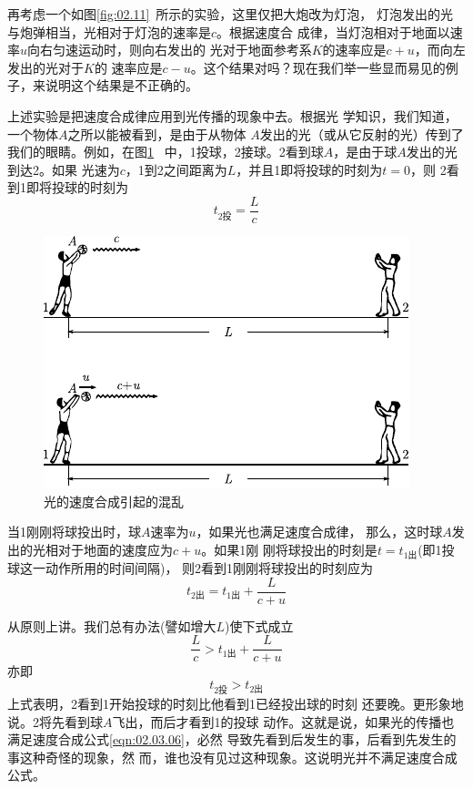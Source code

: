 再考虑一个如图\ref{fig:02.11}~所示的实验，这里仅把大炮改为灯泡，
灯泡发出的光与炮弹相当，光相对于灯泡的速率是$c$。根据速度合
成律，当灯泡相对于地面以速率$u$向右匀速运动时，则向右发出的
光对于地面参考系$K$的速率应是$c+u$，而向左发出的光对于$K$的
速率应是$c-u$。这个结果对吗？现在我们举一些显而易见的例
子，来说明这个结果是不正确的。

上述实验是把速度合成律应用到光传播的现象中去。根据光
学知识，我们知道，一个物体$A$之所以能被看到，是由于从物体
$A$发出的光（或从它反射的光）传到了我们的眼睛。例如，在图\ref{fig:02.12}~
中，1投球，2接球。2看到球$A$，是由于球$A$发出的光到达2。如果
光速为$c$，1到2之间距离为$L$，并且1即将投球的时刻为$t=0$，则
2看到1即将投球的时刻为
\begin{equation*}
    t_{2\text{投}}=\frac{L}{c}
\end{equation*}
\begin{figure}
    \centering
    \includegraphics{figure/fig02.12}
    \caption{光的速度合成引起的混乱}
    \label{fig:02.12}
\end{figure}%
当1刚刚将球投出时，球$A$速率为$u$，如果光也满足速度合成律，
那么，这时球$A$发出的光相对于地面的速度应为$c+u$。如果1刚
刚将球投出的时刻是$t=t_{1\text{出}}$(即1投球这一动作所用的时间间隔)，
则2看到1刚刚将球投出的时刻应为
\begin{equation*}
    t_{2\text{出}} = t_{1\text{出}} + \frac{L}{c+u}
\end{equation*}

从原则上讲。我们总有办法(譬如增大$L$)使下式成立
\begin{equation*}
    \frac{L}{c} > t_{1\text{出}} + \frac{L}{c+u}
\end{equation*}
亦即\vspace{-1.56em}
\begin{equation*}
    t_{2\text{投}} > t_{2\text{出}}
\end{equation*}
上式表明，2看到1开始投球的时刻比他看到1已经投出球的时刻
还要晚。更形象地说。2将先看到球$A$飞出，而后才看到1的投球
动作。这就是说，如果光的传播也满足速度合成公式\eqref{eqn:02.03.06}，必然
导致先看到后发生的事，后看到先发生的事这种奇怪的现象，然
而，谁也没有见过这种现象。这说明光并不满足速度合成公式。

